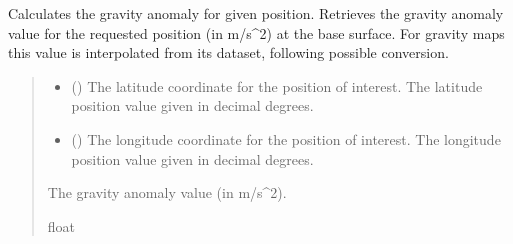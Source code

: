 \documentclass[letterpaper,10pt,english]{sphinxmanual}
\begin{document}
\begin{fulllineitems}

\begin{fulllineitems}
\label{\detokenize{modules/gravity/irish:qnav.gravity.irish.IrishSeaGravity.get_anomaly}}
\pysigstartsignatures
{}
\pysigstopsignatures
\sphinxAtStartPar
Calculates the gravity anomaly for given position.
Retrieves the gravity anomaly value for the requested position
(in m/s\textasciicircum{}2) at the base surface. For gravity maps this value is
interpolated from its dataset, following possible conversion.
\begin{quote}\begin{description}
\begin{itemize}
\item {} 
\sphinxAtStartPar
{} () \textendash{} The latitude coordinate for the position of interest.
The latitude position value given in decimal degrees.

\item {} 
\sphinxAtStartPar
{} () \textendash{} The longitude coordinate for the position of interest.
The longitude position value given in decimal degrees.

\end{itemize}

\sphinxAtStartPar
The gravity anomaly value (in m/s\textasciicircum{}2).

\sphinxAtStartPar
float

\end{description}\end{quote}

\end{fulllineitems}



\end{fulllineitems}
\end{document}
